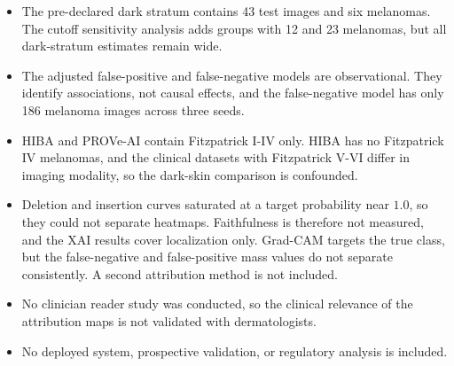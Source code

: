 \begin{itemize}
  \item The pre-declared dark stratum contains 43 test images and six melanomas. The cutoff sensitivity analysis adds groups with 12 and 23 melanomas, but all dark-stratum estimates remain wide.
  \item The adjusted false-positive and false-negative models are observational. They identify associations, not causal effects, and the false-negative model has only 186 melanoma images across three seeds.
  \item HIBA and PROVe-AI contain Fitzpatrick I-IV only. HIBA has no Fitzpatrick IV melanomas, and the clinical datasets with Fitzpatrick V-VI differ in imaging modality, so the dark-skin comparison is confounded.
  \item Deletion and insertion curves saturated at a target probability near $1.0$, so they could not separate heatmaps. Faithfulness is therefore not measured, and the XAI results cover localization only. Grad-CAM targets the true class, but the false-negative and false-positive mass values do not separate consistently. A second attribution method is not included.
  \item No clinician reader study was conducted, so the clinical relevance of the attribution maps is not validated with dermatologists.
  \item No deployed system, prospective validation, or regulatory analysis is included.
\end{itemize}
